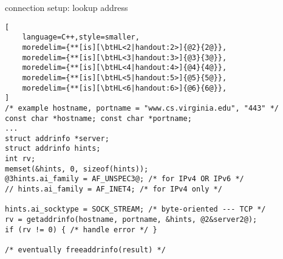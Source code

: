 \begin{frame}[fragile,label=serverLookupClient]{connection setup: lookup address}
\begin{lstlisting}[
    language=C++,style=smaller,
    moredelim={**[is][\btHL<2|handout:2>]{@2}{2@}},
    moredelim={**[is][\btHL<3|handout:3>]{@3}{3@}},
    moredelim={**[is][\btHL<4|handout:4>]{@4}{4@}},
    moredelim={**[is][\btHL<5|handout:5>]{@5}{5@}},
    moredelim={**[is][\btHL<6|handout:6>]{@6}{6@}},
]
/* example hostname, portname = "www.cs.virginia.edu", "443" */
const char *hostname; const char *portname;
...
struct addrinfo *server;
struct addrinfo hints;
int rv;
memset(&hints, 0, sizeof(hints));
@3hints.ai_family = AF_UNSPEC3@; /* for IPv4 OR IPv6 */
// hints.ai_family = AF_INET4; /* for IPv4 only */

hints.ai_socktype = SOCK_STREAM; /* byte-oriented --- TCP */
rv = getaddrinfo(hostname, portname, &hints, @2&server2@);
if (rv != 0) { /* handle error */ }

/* eventually freeaddrinfo(result) */
\end{lstlisting}
\end{frame}

